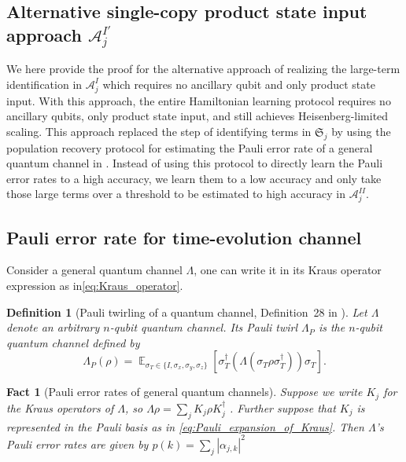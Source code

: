 \documentclass[twocolumn,superscriptaddress,aps,showpacs,amsmath,amstex,amssymb,citeautoscript,floatfix,pra,preprintnumbers]{revtex4-2}
\theoremstyle{plain}
\theoremstyle{plain}
\theoremstyle{plain}
\theoremstyle{plain}
\theoremstyle{plain}
\theoremstyle{plain}
\newtheorem{defn}{Definition}
\newtheorem{fact}[thm]{Fact}
\begin{document}
\begin{appendix}
\section{Alternative single-copy product state input approach \texorpdfstring{$\mathcal{A}^{I'}_j$}{A I' j}}
\label{sec:single-copy}
We here provide the proof for the alternative approach of realizing the large-term identification in $\mathcal{A}^{I}_j$ which requires no ancillary qubit and only product state input. With this approach, the entire Hamiltonian learning protocol requires no ancillary qubits, only product state input, and still achieves Heisenberg-limited scaling. This approach replaced the step of identifying terms in $\mathfrak{S}_j$ by using the population recovery protocol for estimating the Pauli error rate of a general quantum channel in \cite{Flammia2021paulierror}. Instead of using this protocol to directly learn the Pauli error rates to a high accuracy, we learn them to a low accuracy and only take those large terms over a threshold to be estimated to high accuracy in $\mathcal{A}^{II}_j$.

\subsection{Pauli error rate for time-evolution channel}
\label{sec:Pauli_error_rate}
Consider a general quantum channel $\Lambda$, one can write it in its Kraus operator expression as in\eqref{eq:Kraus_operator}.
\begin{defn}[Pauli twirling of a quantum channel, Definition~28 in \cite{Flammia2021paulierror}]
\label{def:Pauli_twirl}
    Let $\Lambda$ denote an arbitrary $n$-qubit quantum channel. Its Pauli twirl $\Lambda_P$ is the $n$-qubit quantum channel defined by
    \begin{equation}
        \Lambda_P(\rho) = \mathop{\mathbb{E}}_{\sigma_T\in\{I, \sigma_x, \sigma_y, \sigma_z\}}\left[ \sigma_T^\dagger \left( \Lambda \left( \sigma_T \rho \sigma_T^\dagger \right) \right) \sigma_T \right].
    \end{equation}
\end{defn}


\begin{fact}[Pauli error rates of general quantum channels]
    Suppose we write $K_j$ for the Kraus operators of $\Lambda$, so $\Lambda\rho = \sum_j  K_j\rho K_j^\dagger$ . Further suppose that $K_j$ is represented in the Pauli basis as in \eqref{eq:Pauli_expansion_of_Kraus}. Then $\Lambda$’s  Pauli error rates are given by $p(k) = \sum_j |\alpha_{j,k}|^2$
\end{fact}


\end{appendix}
\end{document}
